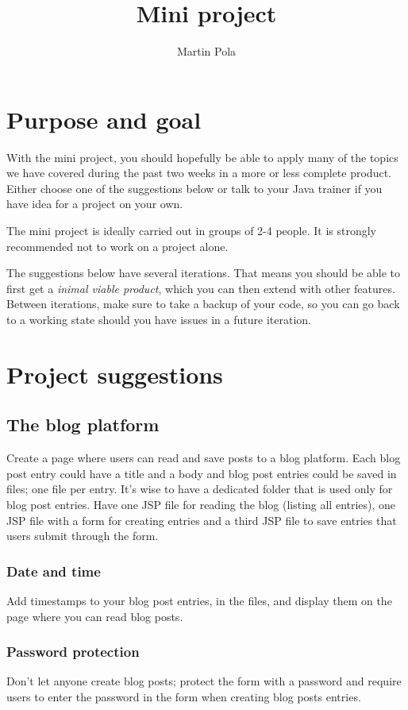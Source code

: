 \documentclass[a4paper, english]{article}
\title{Mini project}
\author{Martin Pola}
\date{}
\begin{document}
    \maketitle

    \section*{Purpose and goal}
        With the mini project, you should hopefully be able to apply many of the topics we have covered during the past two weeks in a more or less complete product. Either choose one of the suggestions below or talk to your Java trainer if you have idea for a project on your own.

        The mini project is ideally carried out in groups of 2-4 people. It is strongly recommended not to work on a project alone.

        The suggestions below have several iterations. That means you should be able to first get a \emph{inimal viable product}, which you can then extend with other features. Between iterations, make sure to take a backup of your code, so you can go back to a working state should you have issues in a future iteration.

    \section*{Project suggestions}
        \subsection*{The blog platform}
            Create a page where users can read and save posts to a blog platform. Each blog post entry could have a title and a body and blog post entries could be saved in files; one file per entry. It's wise to have a dedicated folder that is used only for blog post entries. Have one JSP file for reading the blog (listing all entries), one JSP file with a form for creating entries and a third JSP file to save entries that users submit through the form.

            \subsubsection*{Date and time}
                Add timestamps to your blog post entries, in the files, and display them on the page where you can read blog posts.
            
            \subsubsection*{Password protection}
                Don't let anyone create blog posts; protect the form with a password and require users to enter the password in the form when creating blog posts entries.
                
\end{document}
